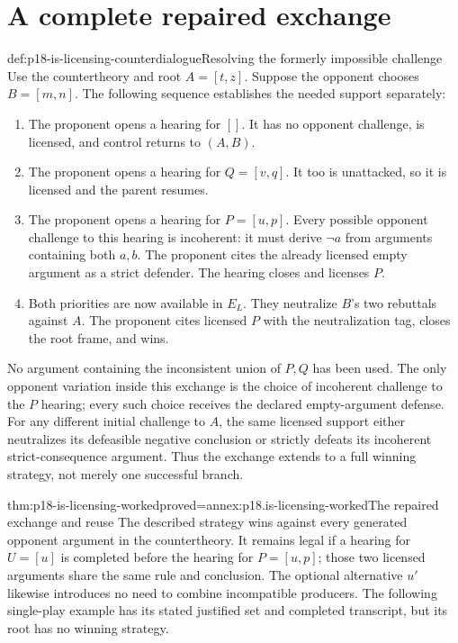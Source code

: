 \section{A complete repaired exchange}

\begin{hbexample}{def:p18-is-licensing-counterdialogue}{Resolving the formerly impossible challenge}
Use the countertheory and root \(A=[t,z]\). Suppose the opponent
chooses \(B=[m,n]\). The following sequence establishes the needed
support separately:
\begin{enumerate}
\item The proponent opens a hearing for \([]\).
It has no opponent challenge, is licensed, and control returns
to \((A,B)\).
\item The proponent opens a hearing for \(Q=[v,q]\).
It too is unattacked, so it is licensed and the parent resumes.
\item The proponent opens a hearing for \(P=[u,p]\).
Every possible opponent challenge to this hearing is incoherent:
it must derive \(\neg a\) from arguments containing both \(a,b\).
The proponent cites the already licensed empty argument as a
strict defender. The hearing closes and licenses \(P\).
\item Both priorities are now available in \(E_L\).
They neutralize \(B\)'s two rebuttals against \(A\).
The proponent cites licensed \(P\) with the neutralization tag,
closes the root frame, and wins.
\end{enumerate}
No argument containing the inconsistent union of \(P,Q\) has
been used. The only opponent variation inside this exchange is
the choice of incoherent challenge to the \(P\) hearing; every
such choice receives the declared empty-argument defense.
For any different initial challenge to \(A\), the same licensed
support either neutralizes its defeasible negative conclusion or
strictly defeats its incoherent strict-consequence argument.
Thus the exchange extends to a full winning strategy, not merely
one successful branch.
\end{hbexample}

\begin{hbtheorem}{thm:p18-is-licensing-worked}{proved=annex:p18.is-licensing-worked}{The repaired exchange and reuse}
The described strategy wins against every generated opponent
argument in the countertheory.
It remains legal if a hearing for \(U=[u]\) is completed before
the hearing for \(P=[u,p]\); those two licensed arguments share
the same rule and conclusion.
The optional alternative \(u'\) likewise introduces no need to
combine incompatible producers.
The following single-play example has its stated justified set
and completed transcript, but its root has no winning strategy.
\end{hbtheorem}

